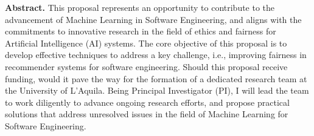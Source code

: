 \documentclass[10pt,notitlepage]{article}
\makeatletter
\newcommand*{\ie}{i.e.,\@\xspace}
\makeatother
\begin{document}
\textbf{Abstract.} This proposal represents an opportunity to contribute to the advancement of Machine Learning in Software Engineering, and aligns with the commitments to innovative research in the field of ethics and fairness for Artificial Intelligence (AI) systems. The core objective of this proposal is to develop effective techniques to address a key challenge, \ie improving fairness in recommender systems for software engineering. %
Should this proposal receive funding, would it pave the way for the formation of a dedicated research team at the University of L'Aquila. Being Principal Investigator (PI), I will lead the team to work diligently to advance ongoing research efforts, and propose practical solutions that address unresolved issues in the field of Machine Learning for Software Engineering. 



\end{document}
